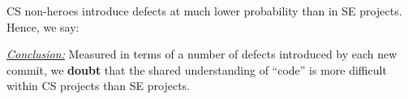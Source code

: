 \documentclass[sigconf]{acmart}
\newenvironment{RQ}{\vspace{1mm}\begin{tcolorbox}[enhanced,width=3.4in,size=fbox,colback=red!5!white,drop shadow southeast,sharp corners]}{\end{tcolorbox}}
\begin{document}
CS non-heroes introduce defects at much lower probability than in SE projects. Hence, we say:

\begin{RQ}
\textit{\underline{Conclusion:}} Measured in terms
of a number of defects introduced by each new commit, we \textbf{doubt} that the shared understanding of ``code'' is more difficult within  CS projects than SE projects.
\end{RQ}




\end{document}
